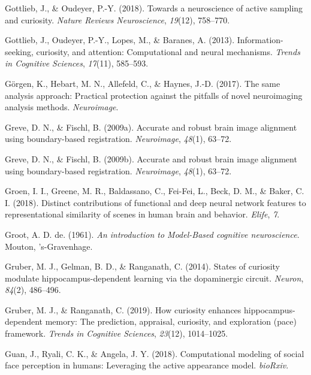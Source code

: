 \documentclass[11pt,american,]{memoir} %
\begin{document}
\leavevmode\hypertarget{ref-gottlieb2018towards}{}%
Gottlieb, J., \& Oudeyer, P.-Y. (2018). Towards a neuroscience of active sampling and curiosity. \emph{Nature Reviews Neuroscience}, \emph{19}(12), 758--770.

\leavevmode\hypertarget{ref-gottlieb2013information}{}%
Gottlieb, J., Oudeyer, P.-Y., Lopes, M., \& Baranes, A. (2013). Information-seeking, curiosity, and attention: Computational and neural mechanisms. \emph{Trends in Cognitive Sciences}, \emph{17}(11), 585--593.

\leavevmode\hypertarget{ref-Gorgen2017-sy}{}%
Görgen, K., Hebart, M. N., Allefeld, C., \& Haynes, J.-D. (2017). The same analysis approach: Practical protection against the pitfalls of novel neuroimaging analysis methods. \emph{Neuroimage}.

\leavevmode\hypertarget{ref-greve2009accurate}{}%
Greve, D. N., \& Fischl, B. (2009a). Accurate and robust brain image alignment using boundary-based registration. \emph{Neuroimage}, \emph{48}(1), 63--72.

\leavevmode\hypertarget{ref-Greve2009-da}{}%
Greve, D. N., \& Fischl, B. (2009b). Accurate and robust brain image alignment using boundary-based registration. \emph{Neuroimage}, \emph{48}(1), 63--72.

\leavevmode\hypertarget{ref-Groen2018-qo}{}%
Groen, I. I., Greene, M. R., Baldassano, C., Fei-Fei, L., Beck, D. M., \& Baker, C. I. (2018). Distinct contributions of functional and deep neural network features to representational similarity of scenes in human brain and behavior. \emph{Elife}, \emph{7}.

\leavevmode\hypertarget{ref-degroot}{}%
Groot, A. D. de. (1961). \emph{An introduction to Model-Based cognitive neuroscience}. Mouton, 's-Gravenhage.

\leavevmode\hypertarget{ref-gruber2014states}{}%
Gruber, M. J., Gelman, B. D., \& Ranganath, C. (2014). States of curiosity modulate hippocampus-dependent learning via the dopaminergic circuit. \emph{Neuron}, \emph{84}(2), 486--496.

\leavevmode\hypertarget{ref-gruber2019curiosity}{}%
Gruber, M. J., \& Ranganath, C. (2019). How curiosity enhances hippocampus-dependent memory: The prediction, appraisal, curiosity, and exploration (pace) framework. \emph{Trends in Cognitive Sciences}, \emph{23}(12), 1014--1025.

\leavevmode\hypertarget{ref-Guan2018-hq}{}%
Guan, J., Ryali, C. K., \& Angela, J. Y. (2018). Computational modeling of social face perception in humans: Leveraging the active appearance model. \emph{bioRxiv}.
\end{document}
